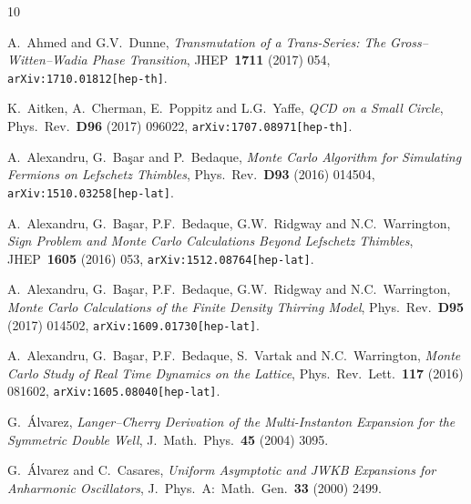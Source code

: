 \documentclass[11pt,a4paper]{article}
\begin{document}
\newpage


%
\begin{thebibliography}{10}

A.~Ahmed and G.V.~Dunne,
\textit{Transmutation of a Trans-Series: The Gross--Witten--Wadia Phase Transition},
JHEP\ \textbf{1711} (2017) 054,
\texttt{arXiv:1710.01812[hep-th]}.

K.~Aitken, A.~Cherman, E.~Poppitz and L.G.~Yaffe,
\textit{QCD on a Small Circle},
Phys.\ Rev.\ \textbf{D96} (2017) 096022,
\texttt{arXiv:1707.08971[hep-th]}.

A.~Alexandru, G.~Ba\c sar and P.~Bedaque,
\textit{Monte Carlo Algorithm for Simulating Fermions on Lefschetz Thimbles},
Phys.\ Rev.\ \textbf{D93} (2016) 014504,
\texttt{arXiv:1510.03258[hep-lat]}.

A.~Alexandru, G.~Ba\c sar, P.F.~Bedaque, G.W.~Ridgway and N.C.~Warrington,
\textit{Sign Problem and Monte Carlo Calculations Beyond Lefschetz Thimbles},
JHEP\ \textbf{1605} (2016) 053,
\texttt{arXiv:1512.08764[hep-lat]}.

A.~Alexandru, G.~Ba\c sar, P.F.~Bedaque, G.W.~Ridgway and N.C.~Warrington,
\textit{Monte Carlo Calculations of the Finite Density Thirring Model},
Phys.\ Rev.\ \textbf{D95} (2017) 014502,
\texttt{arXiv:1609.01730[hep-lat]}.

A.~Alexandru, G.~Ba\c sar, P.F.~Bedaque, S.~Vartak and N.C.~Warrington,
\textit{Monte Carlo Study of Real Time Dynamics on the Lattice},
Phys.\ Rev.\ Lett.\ \textbf{117} (2016) 081602,
\texttt{arXiv:1605.08040[hep-lat]}.

G.~\'Alvarez,
\textit{Langer--Cherry Derivation of the Multi-Instanton Expansion for the Symmetric Double Well},
J.\ Math.\ Phys.\ \textbf{45} (2004) 3095.

G.~\'Alvarez and C.~Casares,
\textit{Uniform Asymptotic and JWKB Expansions for Anharmonic Oscillators},
J.\ Phys.\ A:\ Math.\ Gen.\ \textbf{33} (2000) 2499.


\end{thebibliography}
\end{document}
